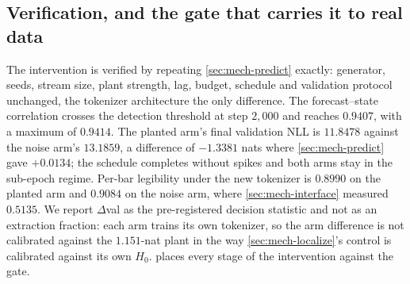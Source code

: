 \subsection{Verification, and the gate that carries it to real data}
\label{sec:mech-gate}

The intervention is verified by repeating \cref{sec:mech-predict} exactly: generator, seeds, stream
size, plant strength, lag, budget, schedule and validation protocol unchanged, the tokenizer
architecture the only difference.
The forecast--state correlation crosses the detection threshold at step $2{,}000$ and reaches
$0.9407$, with a maximum of $0.9414$. The planted arm's final validation NLL is $11.8478$ against
the noise arm's $13.1859$, a difference of $-1.3381$ nats where \cref{sec:mech-predict} gave
$+0.0134$; the schedule completes without spikes and both arms stay in the sub-epoch regime.
Per-bar legibility under the new tokenizer is $0.8990$ on the planted arm and $0.9084$ on the noise
arm, where \cref{sec:mech-interface} measured $0.5135$.
We report $\Delta$val as the pre-registered decision statistic and not as an extraction fraction:
each arm trains its own tokenizer, so the arm difference is not calibrated against the $1.151$-nat
plant in the way \cref{sec:mech-localize}'s control is calibrated against its own $H_0$.  places every stage of the intervention against the gate.
